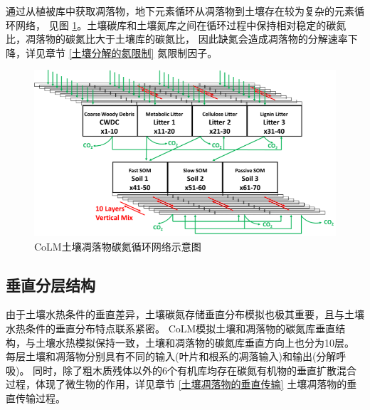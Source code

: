 通过从植被库中获取凋落物，地下元素循环从凋落物到土壤存在较为复杂的元素循环网络，
见图 \ref{fig:CoLM土壤凋落物碳氮循环网络示意图}。土壤碳库和土壤氮库之间在循环过程中保持相对稳定的碳氮比，凋落物的碳氮比大于土壤库的碳氮比，
因此缺氮会造成凋落物的分解速率下降，详见章节 \ref{土壤分解的氮限制} 氮限制因子。
{
  \begin{figure}[htbp]
    \centering
    \includegraphics{Figures/碳氮库结构/CoLM土壤凋落物碳氮循环网络示意图.png}
    \caption{CoLM土壤凋落物碳氮循环网络示意图 \citep{huang2018matrix}  }
    \label{fig:CoLM土壤凋落物碳氮循环网络示意图}
  \end{figure}
}
\subsection{垂直分层结构}\label{垂直分层结构}
由于土壤水热条件的垂直差异，土壤碳氮存储垂直分布模拟也极其重要，且与土壤水热条件的垂直分布特点联系紧密。
CoLM模拟土壤和凋落物的碳氮库垂直结构，与土壤水热模拟保持一致，土壤和凋落物的碳氮库垂直方向上也分为10层。
每层土壤和凋落物分别具有不同的输入(叶片和根系的凋落输入)和输出(分解呼吸)。
同时，除了粗木质残体以外的6个有机库均存在碳氮有机物的垂直扩散混合过程，体现了微生物的作用，详见章节 \ref{土壤凋落物的垂直传输} 土壤凋落物的垂直传输过程。
